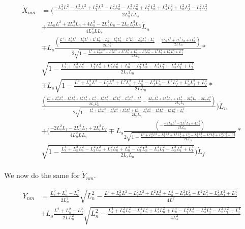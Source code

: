 \documentclass[11pt, landscape]{article}
\begin{document}
\begin{align}
  \dot{X}_{nm} &= \Bigg(\frac{-L_s^2L^2 - L_n^2L^2 + L_t^2L^2 - L_s^2L_{n}^2 - L_n^2L_{n}^2 + L_t^2L_{n}^2 + L_s^2L_{f}^2 + L_n^2L_{f}^2 - L_t^2L_{f}^2}{{2L_n^{3}LL_s}}\\
  &+ \frac{2L_nL^2 + 2L_s^2L_{n} + 4L_n^3 - 2L_t^2L_{n} - 2L_nL_{f}^2\dot{L}_n}{4L_n^2LL_s}\dot{L}_n\\
  &\mp L_s\frac{\left(\frac{L^4 + L_n^2L^2 - L_f^2L^2 + L^2L_{n}^2 + L_{n}^4 - L_f^2L_{n}^2 - L^2L_{f}^2 + L_n^2L_{f}^2 + L_{f}^4}{2LL^2_{n}} - \frac{2L_nL^2 + 2L^2L_{n} + 4L_{n}^3}{2LL_{n}}\right)}{2\sqrt{1-\frac{L^4 + L_n^2L^2 - L_f^2L^2 + L^2L_{n}^2 + L_{n}^4 - L_f^2L_{n}^2 - L^2L_{f}^2 + L_n^2L_{f}^2 + L_{f}^4}{2LL_{n}}}}*\\
  &\sqrt{1-\frac{L_{s}^4 + L_n^2L_{s}^2 - L_t^2L_{s}^2 + L_s^2L_{n}^2 + L_{n}^4 - L_t^2L_{n}^2 - L_s^2L_{t}^2 - L_n^2L_{t}^2 + L_{t}^4}{2L_{s}L_{n}}}\\
  &\mp L_s\sqrt{1-\frac{L^4 + L_n^2L^2 - L_f^2L^2 + L^2L_{n}^2 + L_{n}^4 - L_f^2L_{n}^2 - L^2L_{f}^2 + L_n^2L_{f}^2 + L_{f}^4}{2LL_{n}}}*\\
  &\frac{\left(\frac{L_{s}^4 + L_n^2L_{s}^2 - L_t^2L_{s}^2 + L_s^2L_{n}^2 + L_{n}^4 - L_t^2L_{n}^2 - L_s^2L_{t}^2 - L_n^2L_{t}^2 + L_{t}^4}{2L_{s}L^2_{n}}
    - \frac{2L_nL_{s}^2 + 2L_s^2L_{n} + 4L_{n}^3 - 2L_t^2L_{n} - 2L_nL_{t}^2}{2L_{s}L_{n}}\right)}{2\sqrt{1-\frac{L_{s}^4 + L_n^2L_{s}^2 - L_t^2L_{s}^2 + L_s^2L_{n}^2 + L_{n}^4 - L_t^2L_{n}^2 - L_s^2L_{t}^2 - L_n^2L_{t}^2 + L_{t}^4}{2L_{s}L_{n}}}}\Bigg)\dot{L}_n\\
  &+ \Bigg(\frac{-2L_s^2L_{f} - 2L_n^2L_{f} + 2L_t^2L_{f}}{4L_n^2LL_s} \mp L_s\frac{\left(-\frac{-2L_fL^2 - 2L^2L_{f} + 4L_{f}^3}{2LL_{n}}\right)}{2\sqrt{1-\frac{L^4 + L_n^2L^2 - L_f^2L^2 + L^2L_{n}^2 + L_{n}^4 - L_f^2L_{n}^2 - L^2L_{f}^2 + L_n^2L_{f}^2 + L_{f}^4}{2LL_{n}}}}*\\
  &\sqrt{1-\frac{L_{s}^4 + L_n^2L_{s}^2 - L_t^2L_{s}^2 + L_s^2L_{n}^2 + L_{n}^4 - L_t^2L_{n}^2 - L_s^2L_{t}^2 - L_n^2L_{t}^2 + L_{t}^4}{2L_{s}L_{n}}}\Bigg)\dot{L}_f\\
\end{align}

We now do the same for $\dot{Y}_{nm}$.

\begin{align}
  Y_{nm} &= \frac{L_{s}^2+L_{n}^2-L_{t}^2}{2L^2_{n}} \sqrt{L_n^2-\frac{L^4 + L_n^2L^2 - L_f^2L^2 + L^2L_{n}^2 + L_{n}^4 - L_f^2L_{n}^2 - L^2L_{f}^2 - L_n^2L_{f}^2 + L_{f}^4}{4L^2}}\\
  &\pm L_s\frac{L^2+L_{n}^2-L_{f}^2}{2LL^2_{n}}\sqrt{L^2_n - \frac{L_{s}^4 + L_n^2L_{s}^2 - L_t^2L_{s}^2 + L_s^2L_{n}^2 + L_{n}^4 - L_t^2L_{n}^2 - L_s^2L_{t}^2 - L_n^2L_{t}^2 + L_{t}^4}{4L^2_{s}}}\\
\end{align}
\end{document}
